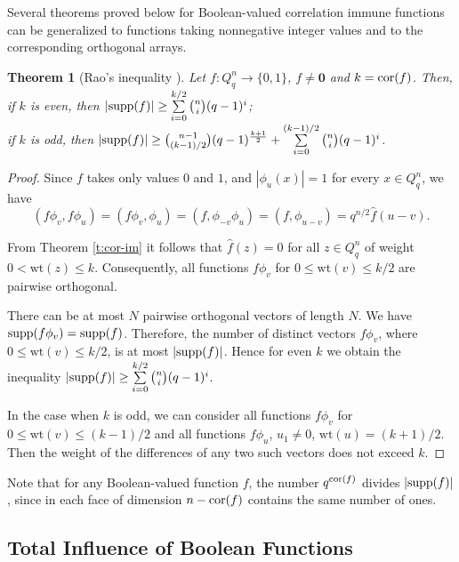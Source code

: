 \documentclass[11pt]{article}
\newtheorem{theorem}{Theorem}[section]
\theoremstyle{definition}
\newcommand{\supp}{{\rm supp}}
\newcommand{\cor}{{\rm cor}}
\begin{document}
{{{Several theorems proved below for Boolean-valued correlation immune functions can be generalized to functions taking nonnegative integer values and to the corresponding orthogonal arrays.


\begin{theorem}[Rao's inequality \cite{Rao}]\quad

Let $f:Q_q^n\rightarrow \{0,1\}$, $f\neq \mathbf{0}$ and $k=\cor(f)$. Then,\\
 if $k$ is even, then $|\supp(f)|\geq
 \sum\limits_{i=0}^{k/2}{ n \choose i}(q-1)^i$;\\
 if $k$ is odd, then
$|\supp(f)|\geq
 { n-1 \choose (k-1)/{2}}(q-1)^{\frac{k+1}{2}}+
 \sum\limits_{i=0}^{(k-1)/2}{ n \choose i}(q-1)^i$.
\end{theorem}
\begin{proof}
Since $f$ takes only values $0$ and $1$, and $|\phi_u(x)|=1$ for every $x\in Q_q^n$, 
we have
\[
(f\phi_v,f\phi_u)=(f\phi_v,\phi_u)=(f,\phi_{-v}\phi_u)=
(f,\phi_{u-v})=q^{n/2}\widehat{f}(u-v).
\]

From Theorem \ref{t:cor-im} it follows that $\widehat{f}(z)=0$ for all
$z\in Q_q^n$ of weight $0<\mathrm{wt}(z)\le k$. Consequently,   all functions $f\phi_v$ for $0\le \mathrm{wt}(v)\le k/2$
are pairwise orthogonal.

 There can be at most $N$ pairwise orthogonal vectors
of length $N$. We have
$\supp(f\phi_v)=\supp(f)$. Therefore, the number of distinct vectors $f\phi_v$, where
$0\le \mathrm{wt}(v)\le k/2$, is at most $|\supp(f)|$. Hence
for even $k$ we obtain the inequality $|\supp(f)|\geq
 \sum\limits_{i=0}^{k/2}{ n \choose i}(q-1)^i$.

 In the case when $k$ is odd, we can consider all functions
$f\phi_v$ for $0\le \mathrm{wt}(v)\le (k-1)/2$ and all functions
$f\phi_u$, $u_1\neq 0$, $\mathrm{wt}(u)= (k+1)/2$. Then the weight of the differences of any two such vectors  does not exceed $k$.
\end{proof}

 Note that for any Boolean-valued function $f$, the number
$q^{\cor(f)}$ divides $|\supp(f)|$, since in each face of
dimension $n-\cor(f)$ contains the same number of ones. 

\subsection{Total Influence  of Boolean Functions}

}}}
\end{document}
